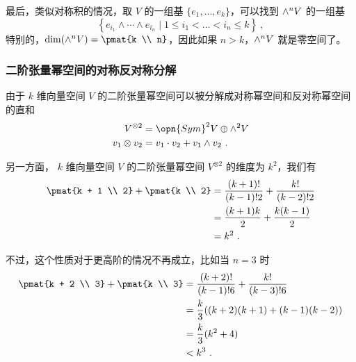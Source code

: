 最后，类似对称积的情况，取 $V$ 的一组基 $\{e_1, \dots, e_k\}$，可以找到 ${\large \wedge}^n V$ 的一组基
\begin{equation}
\left\{ e_{i_1} \wedge \cdots \wedge e_{i_n} \mid 1 \leq i_1 < \dots < i_n \leq k \right\}~,
\end{equation}
特别的，$\dim({\large \wedge}^n V) = \pmat{k \\ n}$，因此如果 $n > k$，${\large \wedge}^n V$ 就是零空间了。

\subsubsection{二阶张量幂空间的对称反对称分解}

由于 $k$ 维向量空间 $V$ 的二阶张量幂空间可以被分解成对称幂空间和反对称幂空间的直和
\begin{equation}
\begin{aligned}
V^{\otimes 2} &= \opn{Sym}^2 V \oplus {\large \wedge}^2 V \\
v_1 \otimes v_2 &= v_1 \cdot v_2 + v_1 \wedge v_2~.
\end{aligned}
\end{equation}

另一方面， $k$ 维向量空间 $V$ 的二阶张量幂空间 $V^{\otimes 2}$ 的维度为 $k^2$，我们有
\begin{equation}
\begin{aligned}
\pmat{k + 1 \\ 2} + \pmat{k \\ 2} &= \frac{(k + 1)!}{(k - 1)! 2} + \frac{k!}{(k - 2)! 2} \\
&= \frac{(k + 1) k}{2} + \frac{k (k - 1)}{2} \\
&= k^2~.
\end{aligned}
\end{equation}

不过，这个性质对于更高阶的情况不再成立，比如当 $n = 3$ 时
\begin{equation}
\begin{aligned}
\pmat{k + 2 \\ 3} + \pmat{k \\ 3} &= \frac{(k + 2)!}{(k - 1)! 6} + \frac{k!}{(k - 3)! 6} \\
&= \frac{k}{3} ((k + 2)(k + 1) + (k - 1) (k - 2)) \\
&= \frac{k}{3} (k^2 + 4) \\
&< k^3~.
\end{aligned}
\end{equation}


